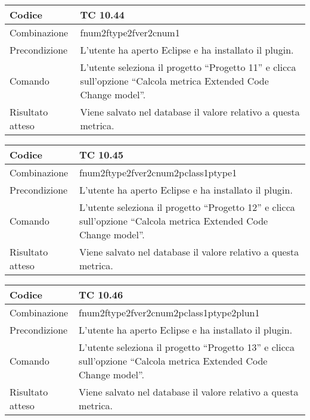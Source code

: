 \begin{table}[ht]
\begin{tabular}{|p{3cm}|p{9cm}|}
\hline
\cellcolor{lightgray}Codice				& TC 10.44								\\
\hline
\cellcolor{lightgray}Combinazione		& fnum2ftype2fver2cnum1									\\
\hline
\cellcolor{lightgray}Precondizione		& L'utente ha aperto Eclipse e ha installato il plugin.		\\
\hline
\cellcolor{lightgray}Comando			& L'utente seleziona il progetto ``Progetto 11''  e clicca sull'opzione ``Calcola metrica Extended Code Change model''.	\\
\hline
\cellcolor{lightgray}Risultato atteso	& Viene salvato nel database il valore relativo a questa metrica.\\
\hline
\end{tabular}
\end{table}

\begin{table}[ht]
\begin{tabular}{|p{3cm}|p{9cm}|}
\hline
\cellcolor{lightgray}Codice				& TC 10.45								\\
\hline
\cellcolor{lightgray}Combinazione		& fnum2ftype2fver2cnum2pclass1ptype1									\\
\hline
\cellcolor{lightgray}Precondizione		& L'utente ha aperto Eclipse e ha installato il plugin.		\\
\hline
\cellcolor{lightgray}Comando			& L'utente seleziona il progetto ``Progetto 12''  e clicca sull'opzione ``Calcola metrica Extended Code Change model''.	\\
\hline
\cellcolor{lightgray}Risultato atteso	& Viene salvato nel database il valore relativo a questa metrica.\\
\hline
\end{tabular}
\end{table}

\begin{table}[ht]
\begin{tabular}{|p{3cm}|p{9cm}|}
\hline
\cellcolor{lightgray}Codice				& TC 10.46								\\
\hline
\cellcolor{lightgray}Combinazione		& fnum2ftype2fver2cnum2pclass1ptype2plun1									\\
\hline
\cellcolor{lightgray}Precondizione		& L'utente ha aperto Eclipse e ha installato il plugin.		\\
\hline
\cellcolor{lightgray}Comando			& L'utente seleziona il progetto ``Progetto 13''  e clicca sull'opzione ``Calcola metrica Extended Code Change model''.	\\
\hline
\cellcolor{lightgray}Risultato atteso	& Viene salvato nel database il valore relativo a questa metrica.\\
\hline
\end{tabular}
\end{table}

